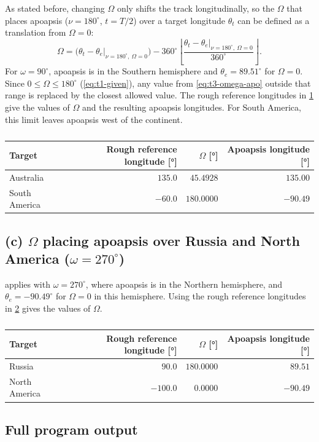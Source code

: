 \begin{newpar}
As stated before, changing $\Omega$ only shifts the track longitudinally, so the $\Omega$ that places apoapsis ($\nu=180^\circ$, $t = T/2$) over a target longitude $\theta_t$ can be defined as a translation from $\Omega = 0$:
\begin{equation}
\boxed{\Omega = \Big(\theta_t - \theta_e\big|_{\nu=180^\circ,\ \Omega=0}\Big) - 360^\circ\left\lfloor \frac{\theta_t - \theta_e\big|_{\nu=180^\circ,\ \Omega=0}}{360^\circ} \right\rfloor}.
\label{eq:t3-omega-apo}
\end{equation}
For $\omega=90^\circ$, apoapsis is in the Southern hemisphere and $\theta_e = 89.51^\circ$ for $\Omega = 0$. Since $0 \le \Omega \le 180^\circ$ (\cref{eq:t1-given}), any value from \cref{eq:t3-omega-apo} outside that range is replaced by the closest allowed value. The rough reference longitudes in \cref{tab:t3b} give the values of $\Omega$ and the resulting apoapsis longitudes. For South America, this limit leaves apoapsis west of the continent.
\end{newpar}

\begin{table}[H]
\centering
\caption{}
\label{tab:t3b}
\color{newtext}
\begin{tabular}{@{}lrrr@{}}
\toprule
Target & Rough reference longitude [\si{\degree}] & $\Omega$ [\si{\degree}] & Apoapsis longitude [\si{\degree}] \\
\midrule
Australia & $135.0$ & $45.4928$ & $135.00$ \\
South America & $-60.0$ & $180.0000$ & $-90.49$ \\
\bottomrule
\end{tabular}
\end{table}

\subsection*{(c) $\Omega$ placing apoapsis over Russia and North America ($\omega=270^\circ$)}

\begin{newpar}
 applies with $\omega=270^\circ$, where apoapsis is in the Northern hemisphere, and $\theta_e = -90.49^\circ$ for $\Omega = 0$ in this hemisphere. Using the rough reference longitudes in \cref{tab:t3c} gives the values of $\Omega$.
\end{newpar}

\begin{table}[H]
\centering
\caption{}
\label{tab:t3c}
\color{newtext}
\begin{tabular}{@{}lrrr@{}}
\toprule
Target & Rough reference longitude [\si{\degree}] & $\Omega$ [\si{\degree}] & Apoapsis longitude [\si{\degree}] \\
\midrule
Russia & $90.0$ & $180.0000$ & $89.51$ \\
North America & $-100.0$ & $0.0000$ & $-90.49$ \\
\bottomrule
\end{tabular}
\end{table}


\clearpage
\subsection*{Full program output}

\FloatBarrier
